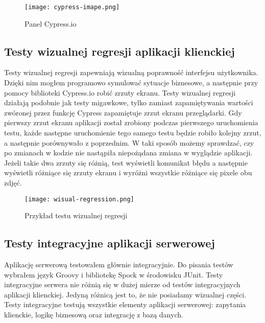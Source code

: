 \begin{figure}
    \texttt{[image: cypress-imape.png]}
    \caption{Panel Cypress.io} \label{fig-cypress}
\end{figure}

\subsection{Testy wizualnej regresji aplikacji klienckiej}
Testy wizualnej regresji zapewniają wizualną poprawność interfejsu użytkownika. Dzięki nim mogłem programowo symulować sytuacje biznesowe, a następnie przy pomocy biblioteki Cypress.io robić zrzuty ekranu. Testy wizualnej regresji działają podobnie jak testy migawkowe, tylko zamiast zapamiętywania wartości zwóronej przez funkcję Cypress zapamiętuje zrzut ekranu przeglądarki. Gdy pierwszy zrzut ekranu aplikacji został zrobiony podczas pierwszego uruchomienia testu, każde następne uruchomienie tego samego testu będzie robiło kolejny zrzut, a następnie porównywało z poprzednim. W taki sposób możemy sprawdzać, czy po zmianach w kodzie nie nastąpiła niepożądana zmiana w wyglądzie aplikacji. Jeżeli takie dwa zrzuty się różnią, test wyświetli komunikat błędu a następnie wyświetli różniące się zrzuty ekranu i wyróżni wszystkie różniące się pixele obu zdjęć.

\begin{figure}
    \texttt{[image: wisual-regression.png]}
    \caption{Przykład testu wizualnej regresji} \label{fig-cypress-vr}
\end{figure}


\subsection{Testy integracyjne aplikacji serwerowej}
Aplikację serwerową testowałem głównie integracyjnie. Do pisania testów wybrałem język Groovy i bibliotekę Spock w środowisku JUnit. Testy integracyjne serwera nie różnią się w dużej mierze od testów integracyjnych aplikacji klienckiej. Jedyną różnicą jest to, że nie posiadamy wizualnej części. Testy integracyjne testują wszystkie elementy aplikacji serwerowej: zapytania klienckie, logikę biznesową oraz integrację z bazą danych.
